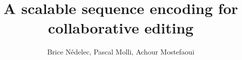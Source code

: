 \documentclass[times]{cpeauth}
\begin{document}
\title{A scalable sequence encoding for collaborative editing}

\author{Brice N{\'e}delec\corrauth, Pascal Molli\corrauth, Achour Mostefaoui\corrauth}

\address{\centering%
  LINA, 2 rue de la Houssini{\`e}re,\\
  BP92208, 44322 Nantes Cedex 03, France\\
  \url{first.last@univ-nantes.fr}
}






\maketitle








% 





\end{document}

